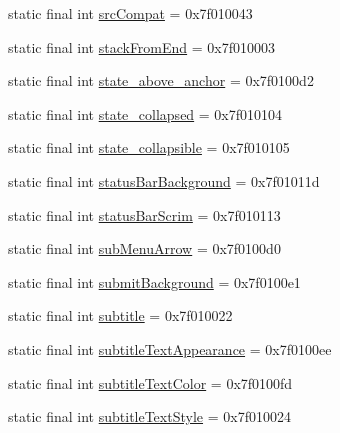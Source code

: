 \begin{CompactItemize}
\item 
static final int \hyperlink{classandroid_1_1support_1_1graphics_1_1drawable_1_1_r_1_1attr_aa42ed699128e7315d09fd3247def5d5}{srcCompat} = 0x7f010043
\item 
static final int \hyperlink{classandroid_1_1support_1_1graphics_1_1drawable_1_1_r_1_1attr_63532934fdd61a1c1513cacc05ebfa90}{stackFromEnd} = 0x7f010003
\item 
static final int \hyperlink{classandroid_1_1support_1_1graphics_1_1drawable_1_1_r_1_1attr_c3063ec611b76eed44aa7b7ca08c8bd3}{state\_\-above\_\-anchor} = 0x7f0100d2
\item 
static final int \hyperlink{classandroid_1_1support_1_1graphics_1_1drawable_1_1_r_1_1attr_c9000c73c233475c748d3a7e58009893}{state\_\-collapsed} = 0x7f010104
\item 
static final int \hyperlink{classandroid_1_1support_1_1graphics_1_1drawable_1_1_r_1_1attr_425b4bb5508ac2c33f42507c0d5274df}{state\_\-collapsible} = 0x7f010105
\item 
static final int \hyperlink{classandroid_1_1support_1_1graphics_1_1drawable_1_1_r_1_1attr_eb9910c58b70f91901fff26bbc37b2e3}{statusBarBackground} = 0x7f01011d
\item 
static final int \hyperlink{classandroid_1_1support_1_1graphics_1_1drawable_1_1_r_1_1attr_7b23faf79ec389b5f3afe4441724b675}{statusBarScrim} = 0x7f010113
\item 
static final int \hyperlink{classandroid_1_1support_1_1graphics_1_1drawable_1_1_r_1_1attr_38cb0a5ccad2334571816af2f2ad85dc}{subMenuArrow} = 0x7f0100d0
\item 
static final int \hyperlink{classandroid_1_1support_1_1graphics_1_1drawable_1_1_r_1_1attr_bdfe6979de1efa6ee80fc315f77661cc}{submitBackground} = 0x7f0100e1
\item 
static final int \hyperlink{classandroid_1_1support_1_1graphics_1_1drawable_1_1_r_1_1attr_621cd07e36a07d14d2e202b0f8b9e0d5}{subtitle} = 0x7f010022
\item 
static final int \hyperlink{classandroid_1_1support_1_1graphics_1_1drawable_1_1_r_1_1attr_649e0a40f11a2fb3850dca5cab6f53c1}{subtitleTextAppearance} = 0x7f0100ee
\item 
static final int \hyperlink{classandroid_1_1support_1_1graphics_1_1drawable_1_1_r_1_1attr_6f2d7cdf0376fd9938d01efb6e7f8527}{subtitleTextColor} = 0x7f0100fd
\item 
static final int \hyperlink{classandroid_1_1support_1_1graphics_1_1drawable_1_1_r_1_1attr_9f3f0885a6c4df766786236282993b01}{subtitleTextStyle} = 0x7f010024

\end{CompactItemize}
